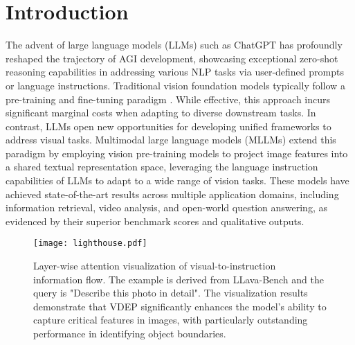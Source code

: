 \section{Introduction}
\label{introduction}

The advent of large language models (LLMs) such as ChatGPT \cite{schulman2022chatgpt} has profoundly reshaped the trajectory of AGI development, showcasing exceptional zero-shot reasoning capabilities in addressing various NLP tasks via user-defined prompts or language instructions. 
Traditional vision foundation models typically follow a pre-training and fine-tuning paradigm \cite{wang2023internimage, chen2022vision, su2023towards, wang2023image, tao2023siamese}. While effective, this approach incurs significant marginal costs when adapting to diverse downstream tasks.
In contrast, LLMs open new opportunities for developing unified frameworks to address visual tasks. Multimodal large language models (MLLMs) extend this paradigm by employing vision pre-training models to project image features into a shared textual representation space, leveraging the language instruction capabilities of LLMs to adapt to a wide range of vision tasks. 
These models have achieved state-of-the-art results across multiple application domains, including information retrieval, video analysis, and open-world question answering, as evidenced by their superior benchmark scores and qualitative outputs. 
\begin{figure*}[ht]
\vskip 0.2in
\begin{center}
\centerline{\texttt{[image: lighthouse.pdf]}}
\caption{Layer-wise attention visualization of visual-to-instruction information flow. The
example is derived from LLava-Bench \cite{liu2024improved} and the query is "Describe this photo in detail". The visualization results demonstrate that VDEP significantly enhances the model's ability to capture critical features in images, with particularly outstanding performance in identifying object boundaries.}
\label{lighthouse}
\end{center}
\vskip -0.2in
\end{figure*}
